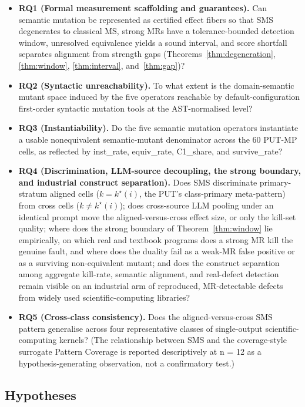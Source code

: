 \documentclass[review,12pt,authoryear]{elsarticle}
\providecommand{\tightlist}{\setlength{\itemsep}{0pt}\setlength{\parskip}{0pt}}
\newcounter{none}                   %
\begin{document}
\begin{itemize}
\tightlist
\item
  \textbf{RQ1 (Formal measurement scaffolding and guarantees).} Can semantic
  mutation be represented as certified effect fibers so that SMS
  degenerates to classical MS, strong MRs have a tolerance-bounded
  detection window, unresolved equivalence yields a sound interval, and
  score shortfall separates alignment from strength gaps
  (Theorems~\ref{thm:degeneration}, \ref{thm:window},
  \ref{thm:interval}, and~\ref{thm:gap})?
\item
  \textbf{RQ2 (Syntactic unreachability).} To what extent is the
  domain-semantic mutant space induced by the five operators reachable
  by default-configuration first-order syntactic mutation tools at the
  AST-normalised level?
\item
  \textbf{RQ3 (Instantiability).} Do the five semantic mutation
  operators instantiate a usable nonequivalent semantic-mutant
  denominator across the 60 PUT-MP cells, as reflected by
  inst\_rate, equiv\_rate, C1\_share, and survive\_rate?
\item
  \textbf{RQ4 (Discrimination, LLM-source decoupling, the strong
  boundary, and industrial construct separation).} Does SMS discriminate
  primary-stratum aligned cells ($k = k^\star(i)$, the PUT's
  class-primary meta-pattern) from
  cross cells ($k \neq k^\star(i)$); does cross-source LLM pooling under an
  identical prompt move the aligned-versus-cross effect size, or only the
  kill-set quality; where does the strong boundary of Theorem~\ref{thm:window}
  lie empirically, on which real and textbook programs does a strong
  MR kill the genuine fault, and where does the duality fail as a weak-MR
  false positive or as a surviving non-equivalent mutant; and does the
  construct separation among aggregate kill-rate, semantic alignment,
  and real-defect detection remain visible on an industrial arm of
  reproduced, MR-detectable defects from widely used
  scientific-computing libraries?
\item
  \textbf{RQ5 (Cross-class consistency).} Does the aligned-versus-cross
  SMS pattern generalise across four representative classes of
  single-output scientific-computing kernels? (The relationship between
  SMS and the coverage-style surrogate Pattern Coverage is reported
  descriptively at n = 12 as a hypothesis-generating observation, not a
  confirmatory test.)
\end{itemize}

\subsection{Hypotheses}\label{hypotheses}
\end{document}
